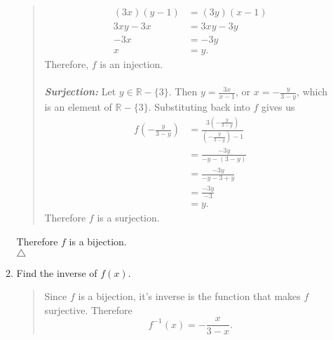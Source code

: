 \documentclass{article}
\newcommand{\RR}{\mathbb{R}}
\begin{document}
\begin{enumerate}
\begin{enumerate}
\begin{quote}
\begin{align*}
(3x)(y - 1) &= (3y)(x - 1)\\
3xy - 3x &= 3xy - 3y\\
-3x &= -3y\\
x &= y.
\end{align*}
Therefore, $f$ is an injection.\\\\
\textit{\textbf{Surjection: }} Let $y \in \RR - \{3\}$.
Then $y = \frac{3x}{x - 1}$, or $x = -\frac{y}{3-y}$, which is an element of $\RR - \{3\}$.
Substituting back into $f$ gives us
\begin{align*}
f\left(-\frac{y}{3-y}\right) &= \frac{3\left(-\frac{y}{3-y}\right)}{\left(-\frac{y}{3-y}\right) - 1}\\
&= \frac{-3y}{-y-(3-y)}\\
&= \frac{-3y}{-y - 3 + y}\\
&= \frac{-3y}{-3}\\
&= y.
\end{align*}
Therefore $f$ is a surjection.
\end{quote}
Therefore $f$ is a bijection.\\
$\triangle$
\item Find the inverse of $f(x)$.
\begin{quote}
Since $f$ is a bijection, it's inverse is the function that makes $f$ surjective. Therefore
\[f^{-1}(x) = -\frac{x}{3 - x}.\]
\end{quote}
\end{enumerate}
\end{enumerate}
\end{document}
